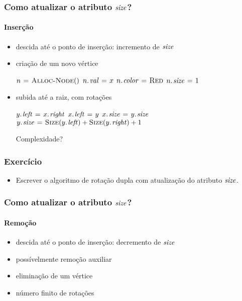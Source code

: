 \documentclass{beamer}
\begin{document}
\begin{frame}
\frametitle{Como atualizar o atributo $\id{size}$?}
\framesubtitle{Inserção}

\begin{itemize}
\item descida até o ponto de inserção: incremento de $\id{size}$
\pause\item criação de um novo vértice
\begin{codebox}
\li $n \mathrel{\hspace{1pt}=\hspace{1pt}} \textnormal{\scshape Alloc-Node}()$
\li $\attrib{n}{val} \gets x$
\li $\attrib{n}{color} \gets \const{Red}$
\li $\attrib{n}{size} \gets 1$
\end{codebox}
\pause\item subida até a raiz, com rotações
\begin{codebox}
\zi {}
\li $\attrib{y}{left} \gets \attrib{x}{right}$
\li $\attrib{x}{left} \gets y$
\li $\attrib{x}{size} \gets \attrib{y}{size}$
\li $\attrib{y}{size} \gets \proc{Size}(\attrib{y}{left}) + \proc{Size}(\attrib{y}{right}) + 1$
\end{codebox}
\pause\alert{Complexidade?}
\end{itemize}
\end{frame}

\begin{frame}
\frametitle{Exercício}

\begin{itemize}
\item Escrever o algoritmo de rotação dupla com atualização do 
  atributo $\id{size}$.
\end{itemize}

\end{frame}

\begin{frame}
\frametitle{Como atualizar o atributo $\id{size}$?}
\framesubtitle{Remoção}

\begin{itemize}
\item descida até o ponto de inserção: decremento de $\id{size}$  
\item possívelmente remoção auxiliar 
\item eliminação de um vértice \only<2>{\alert{$O(1)$}}
\item número finito de rotações 
\end{itemize}

\end{frame}
\end{document}

